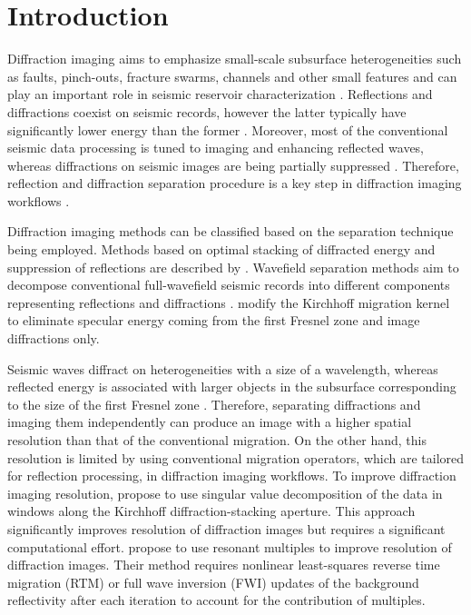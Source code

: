 \section{Introduction}
Diffraction imaging aims to emphasize small-scale subsurface heterogeneities such as faults,
pinch-outs, fracture swarms, channels and other small features and can play an important role
in seismic reservoir characterization \cite[]{landa2012seismic}. Reflections and diffractions
coexist on seismic records, however the latter typically have significantly lower energy than the
former \cite[]{klem-musatov94}. Moreover, most of the conventional
seismic data processing is tuned to imaging and enhancing reflected waves, whereas diffractions on seismic images are being partially suppressed
\cite[]{kozlov04}. Therefore, reflection and diffraction separation procedure 
is a key step in diffraction imaging workflows \cite[]{harlan84,khaidukov04,fomel07}.

Diffraction
imaging methods can be classified based on the separation technique being employed.
Methods based on optimal stacking of diffracted energy and suppression
of reflections are described by \cite{kanasewich88,landa98,berkovitch09,dell11,tsingas11,rad14}.
Wavefield separation methods aim to decompose conventional full-wavefield seismic records into different
components representing reflections and diffractions \cite[]{harlan84,papziner98,taner06,fomel07,reshef09,klokov12,
tyiasning2016comparison,merzlikin2017unconventional,merzlikin2017diffraction,klokov2017integrated}.
\cite{kozlov04,moser08,koren2011full,klokov2013selecting,mihai15} modify the Kirchhoff migration
kernel to eliminate specular energy coming from the first Fresnel zone and image diffractions only.

Seismic waves diffract on heterogeneities with a size of a wavelength, whereas reflected energy is
associated with larger objects in the subsurface corresponding to the size of the first Fresnel zone
\cite[]{moser08}.
Therefore, separating diffractions and imaging them independently can produce
an image with a higher spatial resolution than that of the conventional migration.
On the other hand, this resolution is limited by using conventional migration operators, which are tailored
for reflection processing, in diffraction imaging workflows.
To improve diffraction imaging resolution, \cite{music} propose to use singular value decomposition
of the data in windows along the Kirchhoff diffraction-stacking aperture.
This approach significantly improves resolution of diffraction images but requires a
significant computational effort.
\cite{huang14} propose to use resonant multiples to improve resolution of diffraction images. Their method
requires nonlinear least-squares reverse time migration (RTM) or full wave inversion (FWI)
updates of the background reflectivity after each iteration to account for the contribution of multiples.

